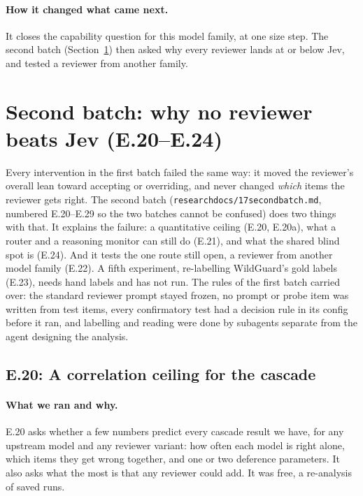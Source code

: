 \documentclass[11pt]{article}
\renewcommand{\_}{\origunderscore\allowbreak}
\begin{document}
\paragraph{How it changed what came next.}
It closes the capability question for this model family, at one size step. The second batch (Section~\ref{sec:batch2}) then asked why every reviewer lands at or below Jev, and tested a reviewer from another family.

\section{Second batch: why no reviewer beats Jev (E.20--E.24)}\label{sec:batch2}

Every intervention in the first batch failed the same way: it moved the reviewer's overall lean toward accepting or overriding, and never changed \emph{which} items the reviewer gets right. The second batch (\texttt{research\_docs/17\_second\_batch.md}, numbered E.20--E.29 so the two batches cannot be confused) does two things with that. It explains the failure: a quantitative ceiling (E.20, E.20a), what a router and a reasoning monitor can still do (E.21), and what the shared blind spot is (E.24). And it tests the one route still open, a reviewer from another model family (E.22). A fifth experiment, re-labelling WildGuard's gold labels (E.23), needs hand labels and has not run. The rules of the first batch carried over: the standard reviewer prompt stayed frozen, no prompt or probe item was written from test items, every confirmatory test had a decision rule in its config before it ran, and labelling and reading were done by subagents separate from the agent designing the analysis.

\subsection{E.20: A correlation ceiling for the cascade}\label{sec:e20}

\paragraph{What we ran and why.}
E.20 asks whether a few numbers predict every cascade result we have, for any upstream model and any reviewer variant: how often each model is right alone, which items they get wrong together, and one or two deference parameters. It also asks what the most is that any reviewer could add. It was free, a re-analysis of saved runs.
\end{document}
